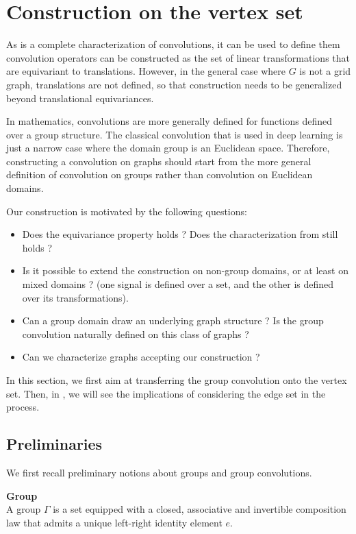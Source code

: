 \section{Construction on the vertex set}
\label{sec:2.2}

As  is a complete characterization of convolutions, it can be used to define them \ie convolution operators can be constructed as the set of linear transformations that are equivariant to translations. However, in the general case where $G$ is not a grid graph, translations are not defined, so that construction needs to be generalized beyond translational equivariances.

In mathematics, convolutions are more generally defined for functions defined over a group structure. The classical convolution that is used in deep learning is just a narrow case where the domain group is an Euclidean space. Therefore, constructing a convolution on graphs should start from the more general definition of convolution on groups rather than convolution on Euclidean domains.

Our construction is motivated by the following questions:
\begin{itemize}[nolistsep,noitemsep]
\item Does the equivariance property holds ? Does the characterization from  still holds ?
\item Is it possible to extend the construction on non-group domains, or at least on mixed domains ? (\ie one signal is defined over a set, and the other is defined over its transformations).
\item Can a group domain draw an underlying graph structure ? Is the group convolution naturally defined on this class of graphs ?
\item Can we characterize graphs accepting our construction ?
\end{itemize}

In this section, we first aim at transferring the group convolution onto the vertex set. Then, in , we will see the implications of considering the edge set in the process.

\subsection{Preliminaries}

We first recall preliminary notions about groups and group convolutions.

\begin{definition}\textbf{Group}\\
A group $\Gamma$ is a set equipped with a closed, associative and invertible composition law that admits a unique left-right identity element $e$.
\end{definition}

